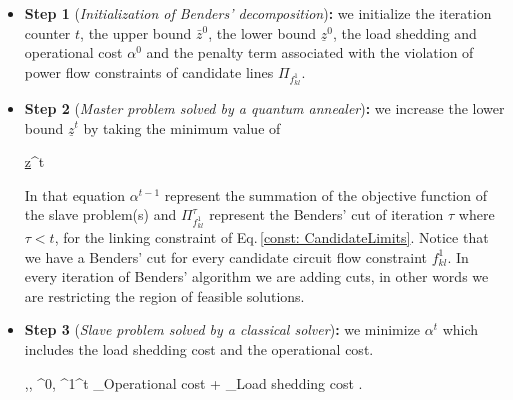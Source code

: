 \begin{itemize}
    \item \textbf{Step 1} (\textit{Initialization of Benders’ decomposition})\textbf{:} we initialize the iteration counter $t$, the upper bound $\bar{z}^{0}$, the lower bound $\underline{z}^{0}$, the load shedding and operational cost $\alpha^{0}$ and the penalty term associated with the violation of power flow constraints of candidate lines $\Pi_{f_{kl}^{1}}$.
    \item \textbf{Step 2} (\textit{Master problem solved by a quantum annealer})\textbf{:} we increase the lower bound $\underline{z}^{t}$ by taking the minimum value of 
        \begin{mini!}[2]
	   {}{\underline{z}^{t}}{}{}{}
        \end{mini!}
    In that equation $\alpha^{t-1}$ represent the summation of the objective function of the slave problem(s) and $\Pi_{f_{kl}^{1}}^{\tau}$ represent the Benders' cut of iteration $\tau$ where $\tau < t$, for the linking constraint of Eq.\,\eqref{const: CandidateLimits}. Notice that we have a Benders' cut for every candidate circuit flow constraint $f_{kl}^{1}$. In every iteration of Benders' algorithm we are adding cuts, in other words we are restricting the region of feasible solutions.
    \item \textbf{Step 3} (\textit{Slave problem solved by a classical solver})\textbf{:} we minimize $\alpha^{t}$ which includes the load shedding cost and the operational cost.
    \begin{mini!}[2]
	{,, ^{0}, ^{1}}{\alpha^{t} \equiv {}_{\textrm{Operational cost}} + _{\textrm{Load shedding cost}}}{}{}{}
    .

\end{mini!}
\end{itemize}
